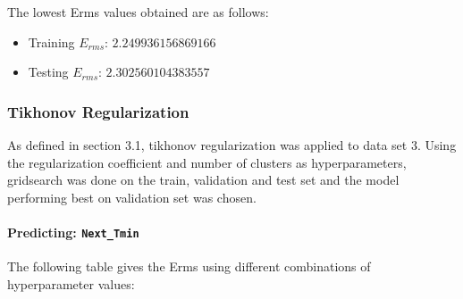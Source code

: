 \documentclass[12pt,a4paper]{article}
\newcommand{\noi}{\noindent}
\def\tt#1{\texttt{#1}}
\begin{document}
\noi
The lowest Erms values obtained are as follows:
\begin{itemize}
    \itemsep0em
    \item Training $E_{rms}$: $2.249936156869166$
    \item Testing $E_{rms}$: $2.302560104383557$
\end{itemize}

\subsubsection{Tikhonov Regularization} 
As defined in section 3.1, tikhonov regularization was applied to data set 3. Using the regularization coefficient and number of clusters as hyperparameters, gridsearch was done on the train, validation and test set and the model performing best on validation set was chosen. 
\paragraph{Predicting: \tt{Next\_Tmin}}
The following table gives the Erms using different combinations of hyperparameter values:


\end{document}
